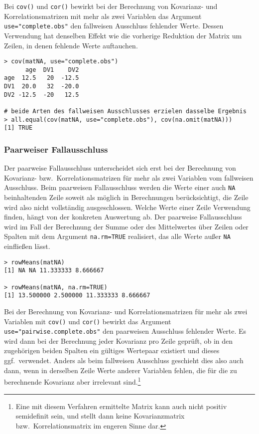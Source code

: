 Bei \lstinline!cov()! und \lstinline!cor()! bewirkt bei der Berechnung von Kovarianz- und Korrelationsmatrizen mit mehr als zwei Variablen das Argument \lstinline!use="complete.obs"! den fallweisen Ausschluss fehlender Werte. Dessen Verwendung hat denselben Effekt wie die vorherige Reduktion der Matrix um Zeilen, in denen fehlende Werte auftauchen.
\begin{lstlisting}
> cov(matNA, use="complete.obs")
      age  DV1    DV2
age  12.5   20  -12.5
DV1  20.0   32  -20.0
DV2 -12.5  -20   12.5

# beide Arten des fallweisen Ausschlusses erzielen dasselbe Ergebnis
> all.equal(cov(matNA, use="complete.obs"), cov(na.omit(matNA)))
[1] TRUE
\end{lstlisting}

\subsubsection{Paarweiser Fallausschluss}

Der paarweise Fallausschluss unterscheidet sich erst bei der Berechnung von Kovarianz- bzw.\ Korrelationsmatrizen für mehr als zwei Variablen vom fallweisen Ausschluss. Beim paarweisen Fallausschluss werden die Werte einer auch \lstinline!NA! beinhaltenden Zeile soweit als möglich in Berechnungen berücksichtigt, die Zeile wird also nicht vollständig ausgeschlossen. Welche Werte einer Zeile Verwendung finden, hängt von der konkreten Auswertung ab. Der paarweise Fallausschluss wird im Fall der Berechnung der Summe oder des Mittelwertes über Zeilen oder Spalten mit dem Argument \lstinline!na.rm=TRUE! realisiert, das alle Werte außer \lstinline!NA! einfließen lässt.
\begin{lstlisting}
> rowMeans(matNA)
[1] NA NA 11.333333 8.666667

> rowMeans(matNA, na.rm=TRUE)
[1] 13.500000 2.500000 11.333333 8.666667
\end{lstlisting}

Bei der Berechnung von Kovarianz- und Korrelationsmatrizen für mehr als zwei Variablen mit \lstinline!cov()! und \lstinline!cor()! bewirkt das Argument \lstinline!use="pairwise.complete.obs"! den paarweisen Ausschluss fehlender Werte. Es wird dann bei der Berechnung jeder Kovarianz pro Zeile geprüft, ob in den zugehörigen beiden Spalten ein gültiges Wertepaar existiert und dieses ggf.\ verwendet. Anders als beim fallweisen Ausschluss geschieht dies also auch dann, wenn in derselben Zeile Werte anderer Variablen fehlen, die für die zu berechnende Kovarianz aber irrelevant sind.\footnote{Eine mit diesem Verfahren ermittelte Matrix kann auch nicht positiv semidefinit sein, und stellt dann keine Kovarianzmatrix bzw.\ Korrelationsmatrix im engeren Sinne dar.}

